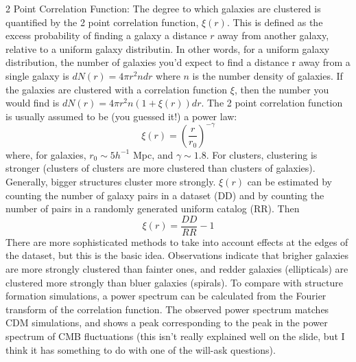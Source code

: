 2 Point Correlation Function:\newline
The degree to which galaxies are clustered is quantified by the 2 point 
correlation function, $\xi (r)$.  This is defined as the excess 
probability of finding a galaxy a distance $r$ away from another galaxy, 
relative to a uniform galaxy distributin.  In other words, for a uniform 
galaxy distribution, the number of galaxies you'd expect to find a distance 
r away from a single galaxy is $dN(r)=4\pi r^2ndr$ where $n$ is the number 
density of galaxies.  If the galaxies are clustered with a correlation function 
$\xi$, then the number you would find is $dN(r)=4\pi r^2n(1+\xi(r))dr$.  
The 2 point correlation function is usually assumed to be (you guessed it!) a 
power law:
\begin{equation}
\xi(r)=\left(\frac{r}{r_0}\right)^{-\gamma}
\end{equation}
where, for galaxies, $r_0\sim5h^{-1}$ Mpc, and $\gamma\sim1.8$.  For clusters, 
clustering is stronger (clusters of clusters are more clustered than clusters 
of galaxies).  Generally, bigger structures cluster more strongly.  $\xi (r)$ 
can be estimated by counting the number of galaxy pairs in a dataset (DD) 
and by counting the number of pairs in a randomly generated uniform catalog 
(RR).  Then
\begin{equation}
\xi (r)=\frac{DD}{RR}-1
\end{equation}
There are more sophisticated methods to take into account effects at the edges 
of the dataset, but this is the basic idea.  Observations indicate that 
brigher galaxies are more strongly clustered than fainter ones, and redder 
galaxies (ellipticals) are clustered more strongly than bluer galaxies 
(spirals).  To compare with structure formation simulations, a power spectrum 
can be calculated from the Fourier transform of the correlation function.  
The observed power spectrum matches CDM simulations, and shows a peak 
corresponding to the peak in the power spectrum of CMB fluctuations (this 
isn't really explained well on the slide, but I think it has something to do 
with one of the will-ask questions).  

